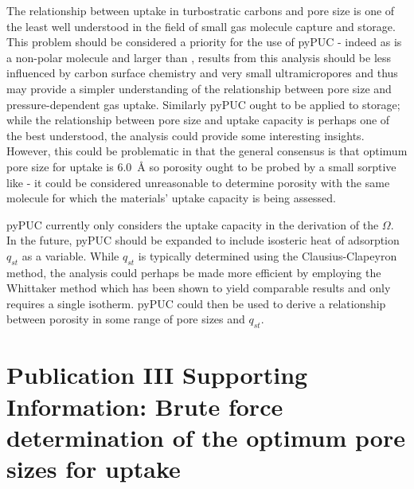 The relationship between  uptake in \glspl{turbostratic carbon} and pore size is one of the least well understood in the field of small gas molecule capture and storage.\citep{Matranga1992Molecular, Tan1990Adsorption, Simon2015materials, Biloe2002Optimal} This problem should be considered a priority for the use of pyPUC - indeed as  is a non-polar molecule and larger than ,\citep{Breck1974Zeolite, Poling2001Properties} results from this analysis should be less influenced by carbon surface chemistry and very small \glspl{ultramicropore} and thus may provide a simpler understanding of the relationship between pore size and pressure-dependent gas uptake. Similarly pyPUC ought to be applied to  storage; while the relationship between pore size and  uptake capacity is perhaps one of the best understood, the analysis could provide some interesting insights. However, this could be problematic in that the general consensus is that optimum pore size for  uptake is \qty{6.0}{\angstrom}\citep{DelaCasaLillo2002Hydrogen, Cabria2007optimum} so porosity ought to be probed by a small sorptive like  - it could be considered unreasonable to determine porosity with the same molecule for which the materials' uptake capacity is being assessed.

pyPUC currently only considers the uptake capacity in the derivation of the $\Omega$. In the future, pyPUC should be expanded to include isosteric heat of \gls{adsorption} $q_{st}$ as a variable. While $q_{st}$ is typically determined using the Clausius-Clapeyron method,\citep{clausius1850ueber, clapeyron1834memoire} the analysis could perhaps be made more efficient by employing the Whittaker method which has been shown to yield comparable results and only requires a single isotherm.\citep{whittaker2013predicting, li2018adsorption} pyPUC could then be used to derive a relationship between porosity in some range of pore sizes and $q_{st}$.

\newpage
\section[Publication III Supporting Information]{\texorpdfstring{Publication III Supporting Information: Brute force determination of the optimum pore sizes for  uptake}{Publication III Supporting Information: Brute force determination of the optimum pore sizes for CO2 uptake}}

\setcounter{opagenum}{\thepage}

\newpage

\setlength{\originalVOffset}{\voffset}   
\setlength{\originalHOffset}{\hoffset}

\setlength{\voffset}{0cm}
\setlength{\hoffset}{0cm}

\setlength{\voffset}{\originalVOffset}
\setlength{\hoffset}{\originalHOffset}


